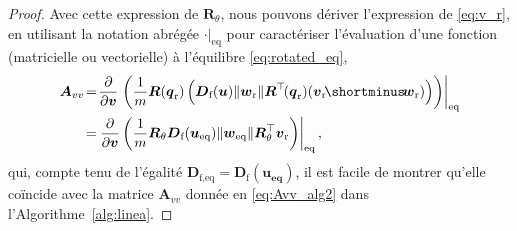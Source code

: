 \begin{proof}
Avec cette expression de $ \boldsymbol{R}_\theta$, nous pouvons dériver l'expression de \eqref{eq:v_r}, en utilisant la notation abrégée $\left. \cdot \right|_{\text{eq}}$ pour caractériser l'évaluation d'une fonction (matricielle ou vectorielle) à l'équilibre \eqref{eq:rotated_eq},
\begin{align}
\nonumber
\boldsymbol{A}_{vv} &\!=\! \frac{\partial }{\partial \boldsymbol{v}}  \left. \left( \frac{1}{m} \boldsymbol{R}(\boldsymbol{q}_{\text{r}}) \left( %
\boldsymbol{D}_{\text{f}}(\boldsymbol{u}) \lVert \boldsymbol{w}_{\text{r}} \rVert \boldsymbol{R}^\top \!(\boldsymbol{q}_{\mathrm{r}}) ( \boldsymbol{v}_{\mathrm{r}} \! \shortminus \! \boldsymbol{w}_{\text{r}})  \right) \right)\right|_{\text{eq}}\\
&\!=\!  \left. \frac{\partial }{\partial \boldsymbol{v}} \left( \frac{1}{m}  \boldsymbol{R}_\theta  \boldsymbol{D}_{\text{f}}(\boldsymbol{u_{\text{eq}}}) \lVert \boldsymbol{w}_{\mathrm{eq}} \rVert   \boldsymbol{R}_\theta^\top  \boldsymbol{v}_{\mathrm{r}} \right) \right|_{\text{eq}},
\label{eq:Avv_derivation}
\end{align} 
qui, compte tenu de l'égalité $\boldsymbol{D}_{\text{f,eq}} = \boldsymbol{D}_{\text{f}}(\boldsymbol{u_{\text{eq}}})$, il est facile de montrer qu'elle coïncide avec la matrice
$\boldsymbol{A}_{vv}$ donnée en \eqref{eq:Avv_alg2} dans l'Algorithme~\ref{alg:linea}.


\end{proof}
